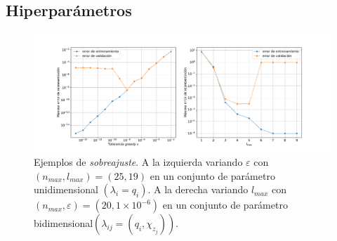 
\subsection{Hiperparámetros}

\begin{figure}[h!]
\centering
\includegraphics[width=1\columnwidth ,trim={2cm, 1cm, 1cm, 1.2cm}]{figs/overfit.pdf}
\caption{Ejemplos de \textit{sobreajuste}. A la izquierda variando $\varepsilon$ con $(n_{max}, l_{max}) = (25, 19)$ en un conjunto de parámetro unidimensional $(\lambda_i = q_i)$. A la derecha variando $l_{max}$ con $(n_{max}, \varepsilon) = (20, 1\times10^{-6})$ en un conjunto de parámetro bidimensional$(\lambda_{ij} = (q_i, \chi_{z_j})) $.}
\label{fig:overfit}
\end{figure}


